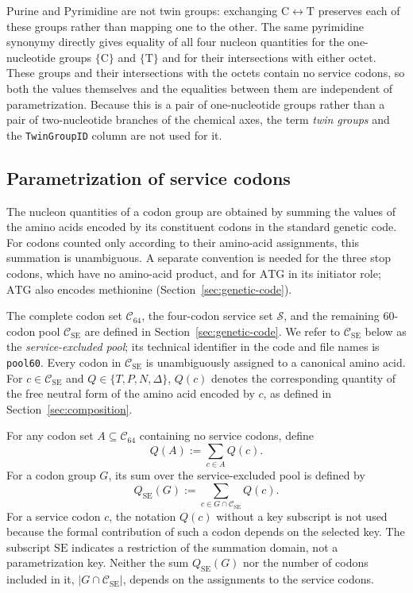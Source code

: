 \documentclass[11pt,a4paper]{article}
\renewcommand{\_}{\origunderscore\allowbreak}
\begin{document}
Purine and Pyrimidine are not twin groups: exchanging
$\mathrm{C}\leftrightarrow\mathrm{T}$ preserves each of these groups
rather than mapping one to the other. The same pyrimidine synonymy
directly gives equality of all four nucleon quantities for the
one-nucleotide groups $\{\mathrm{C}\}$ and $\{\mathrm{T}\}$ and for
their intersections with either octet. These groups and their
intersections with the octets contain no service codons, so both the
values themselves and the equalities between them are independent of
parametrization. Because this is a pair of one-nucleotide groups rather
than a pair of two-nucleotide branches of the chemical axes, the term
\emph{twin groups} and the \texttt{Twin\_Group\_ID} column are not used
for it.

\subsection{Parametrization of service codons}
\label{sec:parametrization}

The nucleon quantities of a codon group are obtained by summing the
values of the amino acids encoded by its constituent codons in the
standard genetic code. For codons counted only according to their
amino-acid assignments, this summation is unambiguous. A separate
convention is needed for the three stop codons, which have no
amino-acid product, and for $\mathrm{ATG}$ in its initiator role;
$\mathrm{ATG}$ also encodes methionine
(Section~\ref{sec:genetic-code}).

The complete codon set $\mathcal{C}_{64}$, the four-codon service set
$\mathcal{S}$, and the remaining 60-codon pool
$\mathcal{C}_{\mathrm{SE}}$ are defined in
Section~\ref{sec:genetic-code}. We refer to
$\mathcal{C}_{\mathrm{SE}}$ below as the \emph{service-excluded pool};
its technical identifier in the code and file names is
\texttt{pool60}.
Every codon in $\mathcal{C}_{\mathrm{SE}}$ is unambiguously assigned
to a canonical amino acid. For
$c\in\mathcal{C}_{\mathrm{SE}}$ and
$Q\in\{T,P,N,\Delta\}$, $Q(c)$ denotes the corresponding quantity
of the free neutral form of the amino acid encoded by $c$, as defined
in Section~\ref{sec:composition}.

For any codon set $A\subseteq\mathcal{C}_{64}$ containing no service
codons, define
\[
Q(A):=\sum_{c\in A}Q(c).
\]
For a codon group $G$, its sum over the service-excluded pool is
defined by
\[
Q_{\mathrm{SE}}(G)
:=
\sum_{c\in G\cap\mathcal{C}_{\mathrm{SE}}}Q(c).
\]
For a service codon $c$, the notation $Q(c)$ without a key subscript
is not used because the formal contribution of such a codon depends
on the selected key. The
subscript $\mathrm{SE}$ indicates a restriction of the summation
domain, not a parametrization key. Neither the sum
$Q_{\mathrm{SE}}(G)$ nor the number of codons included in it,
$|G\cap\mathcal{C}_{\mathrm{SE}}|$, depends on the assignments to the
service codons.
\end{document}
